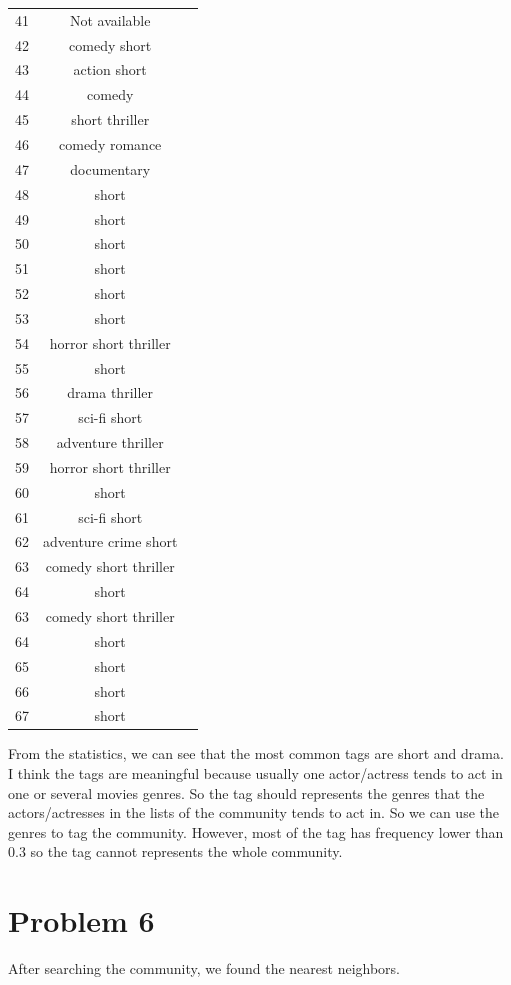 \documentclass{article}
\begin{document}
\begin {table}[htbp]
\begin{adjustbox}{center}
\begin{tabular}{|c|c|c}
41&Not available\\
42&comedy short\\
43&action short\\
44& comedy\\
45&short thriller\\
46&comedy romance\\
47&documentary\\
48&short\\
49&short\\
50&short\\
51&short\\
52&short\\
53&short\\
54&horror short thriller\\
55&short\\
56&drama thriller\\
57& sci-fi short\\
58&adventure thriller\\
59&horror short thriller\\
60&short\\
61& sci-fi short\\
62&adventure crime short\\
63&comedy short thriller\\
64& short\\
63&comedy short thriller\\
64& short\\
65&short\\
66& short\\
67&short\\
\hline

\end{tabular}
\end{adjustbox}
\end{table}
\newpage
\noindent From the statistics, we can see that the most common tags are short and drama.
I think the tags are meaningful because usually one actor/actress tends to act in one or several movies genres. So the tag should represents the genres that the actors/actresses in the lists of the community tends to act in. 
So we can use the genres to tag the community.
However, most of the tag has frequency lower than 0.3 so the tag cannot represents the whole community.
\section{Problem 6}
After searching the community, we found the nearest neighbors.\\
\end{document}
